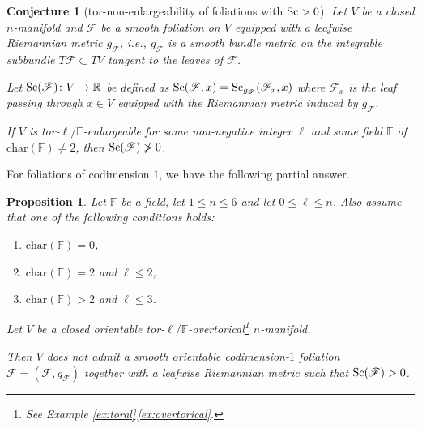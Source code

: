 \documentclass[pdftex]{sigma}
\numberwithin{equation}{section}
\newtheorem{Proposition}[Theorem]{Proposition}
\newtheorem{Conjecture}[Theorem]{Conjecture}
 { \theoremstyle{definition}
\newtheorem{Definition}[Theorem]{Definition}
\newtheorem{Note}[Theorem]{Note}
\newtheorem{Example}[Theorem]{Example}
\newtheorem{Remark}[Theorem]{Remark}
}
\newcommand{\F}{\mathbb{F}}
\newcommand{\R}{\mathbb{R}}
\newcommand{\charac}{\mathrm{char}}
\newcommand{\Sc}{{\rm Sc}}
\newcommand{\myicon}{$\,\,\,\triangleright$}
\begin{document}
\begin{Conjecture}[tor-non-enlargeability of foliations with $\Sc>0$] \label{foliations}
 Let $V$ be a closed $n$-manifold and $\mathscr F$ be a smooth foliation on $V$ equipped with a leafwise Riemannian metric $g_{\mathscr F}$, i.e., $g_{\mathscr F}$ is a smooth bundle metric on the integrable subbundle $T \mathscr F \subset TV$ tangent to the leaves of $\mathscr F$.

Let $\Sc(\mathscr F) \colon V \to \R$ be defined as $\Sc(\mathscr F, x) = \Sc_{g_{\mathscr F}}({\mathscr F}_x , x)$ where ${\mathscr F}_x$ is the leaf passing through $x \in V$ equipped with the Riemannian metric induced by $g_{\mathscr F}$.


If $V$ is tor-$\ell / \mathbb F$-enlargeable for some non-negative integer $\ell$ and some field $\F$ of $\charac(\F) \neq 2$, then $\Sc(\mathscr F) \ngtr 0$.
 \end{Conjecture}

For foliations of codimension $1$, we have the following partial answer.

\begin{Proposition} Let $\F$ be a field, let $1 \leq n \leq 6$ and let $0 \leq \ell \leq n$.
Also assume that one of the following conditions holds:
\begin{enumerate}[\myicon]\itemsep=0pt
 \item $\charac(\F) = 0$,
 \item $\charac(\F) = 2$ and $\ell \leq 2$,
 \item $\charac(\F) > 2$ and $\ell \leq 3$.
\end{enumerate}
Let $V$ be a closed orientable tor-$\ell/\F$-overtorical\footnote{See Example \ref{ex:toral}\,\ref{ex:overtorical}.} $n$-manifold.

Then $V$ does not admit a smooth orientable codimension-$1$ foliation $\mathscr F=(\mathscr F, g_{\mathscr F})$ together with a leafwise Riemannian metric such that $ \Sc (\mathscr F)>0$.
\end{Proposition}
\end{document}
